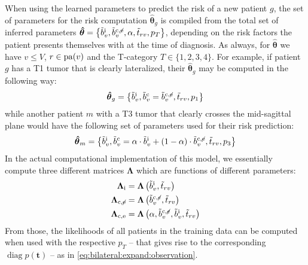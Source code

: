 \documentclass[\relativeRoot/main.tex]{subfiles}
\begin{document}
When using the learned parameters to predict the risk of a new patient $g$, the set of parameters for the risk computation $\boldsymbol{\hat{\theta}}_g$ is compiled from the total set of inferred parameters $\boldsymbol{\hat{\theta}} = \big\{ \Tilde{b}_v^\text{i} , \Tilde{b}_v^{\text{c} , \centernot{\text{e}}} , \alpha, \Tilde{t}_{rv}, p_T \big\}$, depending on the risk factors the patient presents themselves with at the time of diagnosis. As always, for $\boldsymbol{\hat{\theta}}$ we have $v \leq V$, $r \in \operatorname{pa}(v)$ and the T-category $T \in \{ 1, 2, 3, 4 \}$. For example, if patient $g$ has a T1 tumor that is clearly lateralized, their $\boldsymbol{\hat{\theta}}_g$ may be computed in the following way:
%
\begin{equation}
    \boldsymbol{\hat{\theta}}_g = \left\{ \tilde{b}_v^\text{i} , \tilde{b}_v^\text{c} = \tilde{b}_v^{\text{c}, \centernot{\text{e}}} , \tilde{t}_{rv} , p_1 \right\}
\end{equation}
%
while another patient $m$ with a T3 tumor that clearly crosses the mid-sagittal plane would have the following set of parameters used for their risk prediction:
%
\begin{equation}
    \boldsymbol{\hat{\theta}}_m = \left\{ \tilde{b}_v^\text{i} , \tilde{b}_v^\text{c} = \alpha \cdot \Tilde{b}_v^\text{i} + (1 - \alpha) \cdot \Tilde{b}_v^{\text{c} , \centernot{\text{e}}} , \tilde{t}_{rv} , p_3 \right\}
\end{equation}
%
In the actual computational implementation of this model, we essentially compute three different matrices $\boldsymbol{\Lambda}$ which are functions of different parameters:
%
\begin{equation}
    \begin{aligned}
        \boldsymbol{\Lambda}_\text{i} &= \boldsymbol{\Lambda} \left( \tilde{b}_v^\text{i} , \tilde{t}_{rv} \right) \\
        \boldsymbol{\Lambda}_{\text{c} , \centernot{\text{e}}} &= \boldsymbol{\Lambda}\left( \tilde{b}_v^{\text{c} , \centernot{e}} , \tilde{t}_{rv} \right) \\
        \boldsymbol{\Lambda}_{\text{c} , \text{e}} &= \boldsymbol{\Lambda} \left( \alpha , \tilde{b}_v^{\text{c} , \centernot{e}} , \tilde{b}_v^\text{i} , \tilde{t}_{rv} \right)
    \end{aligned}
\end{equation}
%
From those, the likelihoods of all patients in the training data can be computed when used with the respective $p_T$ -- that gives rise to the corresponding $\operatorname{diag}{p(\mathbf{t})}$ -- as in \cref{eq:bilateral:expand:observation}.
\end{document}
